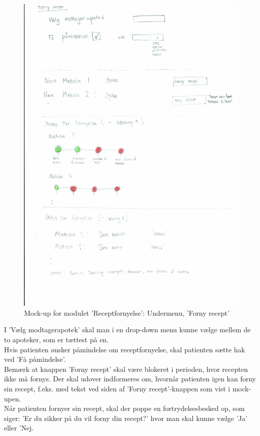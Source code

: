 \begin{figure}[H]
	\centering
	\includegraphics[angle=0, width=\linewidth]{Materials/FornyRecept.pdf}
	\caption{Mock-up for modulet 'Receptfornyelse': Undermenu, 'Forny recept'}
	\label{fig:Mock-Up2}
\end{figure}
I 'Vælg modtagerapotek' skal man i en drop-down menu kunne vælge mellem de to apoteker, som er tættest på en.\\
Hvis patienten ønsker påmindelse om receptfornyelse, skal patienten sætte hak ved 'Få påmindelse'.\\
Bemærk at knappen 'Forny recept' skal være blokeret i perioden, hvor recepten ikke må fornys. Der skal udover indformeres om, hvornår patienten igen kan forny sin recept, f.eks. med tekst ved siden af 'Forny recept'-knappen som vist i mock-upen.\\
Når patienten fornyer sin recept, skal der poppe en fortrydelsesbesked op, som siger: 'Er du sikker på du vil forny din recept?' hvor man skal kunne vælge 'Ja' eller 'Nej.\\
